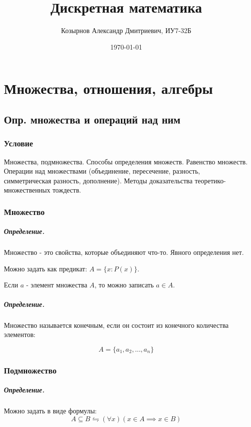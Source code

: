 \documentclass{report}
\title{Дискретная математика}
\author{Козырнов Александр Дмитриевич, ИУ7-32Б}
\date{\today}
\begin{document}
\maketitle
\tableofcontents
\newpage

\chapter{Множества, отношения, алгебры}
\section{Опр. множества и операций над ним}

\subsection{Условие}
Множества, подмножества. Способы определения множеств. Равенство множеств.
Операции над множествами (объединение, пересечение, разность, симметрическая
разность, дополнение). Методы доказательства теоретико-множественных тождеств.

\subsection{Множество}
\paragraph*{Определение.}
Множество - это свойства, которые объединяют что-то. Явного определения нет.

Можно задать как предикат: $A = \{x: P(x)\} $.

\medskip

Если $a$ - элемент множества  $A$, то можно записать  $a \in A$.

\paragraph*{Определение.}
Множество называется конечным, если он состоит из конечного количества элементов:

\[
A = \{a_1,a_2,\ldots,a_{n}\} 
\] 


\subsection{Подмножество}
\paragraph*{Определение.}
Можно задать в виде формулы:
\[
A \subseteq B \leftrightharpoons (\forall x)(x \in A \implies x \in B)
\] 
\end{document}
